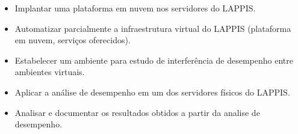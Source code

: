 \begin{itemize}
\item Implantar uma plataforma em nuvem nos servidores do LAPPIS.
\item Automatizar parcialmente a infraestrutura virtual do LAPPIS (plataforma em nuvem, serviços oferecidos).
\item Estabelecer um ambiente para estudo de interferência de desempenho entre ambientes virtuais.
\item Aplicar a análise de desempenho em um dos servidores físicos do LAPPIS.
\item Analisar e documentar os resultados obtidos a partir da analise de desempenho.


\end{itemize}

